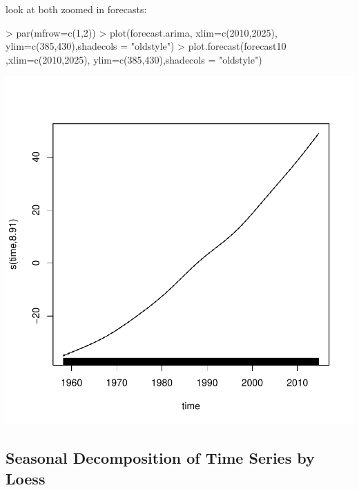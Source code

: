 \documentclass[11pt, a4paper]{article} %
\begin{document}
\linebreak
look at both zoomed in forecasts:
\begin{Schunk}
\begin{Sinput}
> par(mfrow=c(1,2))
> plot(forecast.arima, xlim=c(2010,2025), ylim=c(385,430),shadecols = "oldstyle")
> plot.forecast(forecast10 ,xlim=c(2010,2025), ylim=c(385,430),shadecols = "oldstyle")
\end{Sinput}
\end{Schunk}
\includegraphics{alleselena-069}



\subsection{Seasonal Decomposition of Time Series by Loess}
\end{document}
